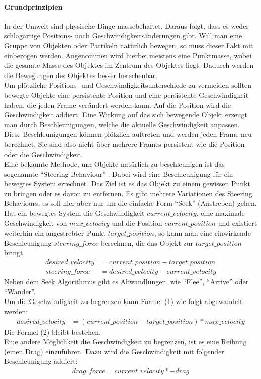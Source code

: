 \documentclass[11pt,a4paper]{article}
\begin{document}
\paragraph{Grundprinzipien}
In der Umwelt sind physische Dinge massebehaftet. Daraus folgt, dass es weder schlagartige Positions- noch Geschwindigkeitsänderungen gibt. Will man eine Gruppe von Objekten oder Partikeln natürlich bewegen, so muss dieser Fakt mit einbezogen werden. Angenommen wird hierbei meistens eine Punktmasse, wobei die gesamte Masse des Objektes im Zentrum des Objektes liegt. Dadurch werden die Bewegungen des Objektes besser berechenbar.\\
Um plötzliche Positions- und Geschwindigkeitsunterschiede zu vermeiden sollten bewegte Objekte eine persistente Position und eine persistente Geschwindigkeit haben, die jeden Frame verändert werden kann. Auf die Position wird die Geschwindigkeit addiert. Eine Wirkung auf das sich bewegende Objekt erzeugt man durch Beschleunigungen, welche die aktuelle Geschwindigkeit anpassen. Diese Beschleunigungen können plötzlich auftreten und werden jeden Frame neu berechnet. Sie sind also nicht über mehrere Frames persistent wie die Position oder die Geschwindigkeit.\\
Eine bekannte Methode, um Objekte natürlich zu beschleunigen ist das sogenannte ``Steering Behaviour'' \cite{580abc6c6615ef9f9c16f9069351938a0dda3c5120b7e8d1450d6b1abf0a71df}. Dabei wird eine Beschleunigung für ein bewegtes System errechnet. Das Ziel ist es das Objekt zu einem gewissen Punkt zu bringen oder es davon zu entfernen. Es gibt mehrere Variationen des Steering Behaviours, es soll hier aber nur um die einfache Form ``Seek'' (Anstreben) gehen.\\
Hat ein bewegtes System die Geschwindigkeit $current\_velocity$, eine maximale Geschwindigkeit von $max\_velocity$ und die Position $current\_position$ und existiert weiterhin ein angestrebter Punkt $target\_position$, so kann man eine einwirkende Beschleunigung $steering\_force$ berechnen, die das Objekt zur $target\_position$ bringt.
\begin{align}
desired\_velocity &= current\_position - target\_position \\
steering\_force &= desired\_velocity - current\_velocity
\end{align}
Neben dem Seek Algorithmus gibt es Abwandlungen, wie ``Flee'', ``Arrive'' oder ``Wander''.\\
Um die Geschwindigkeit zu begrenzen kann Formel (1) wie folgt abgewandelt werden:
\begin{align}
desired\_velocity &= (current\_position - target\_position) * max\_velocity
\end{align}
\noindent
Die Formel (2) bleibt bestehen.\\
Eine andere Möglichkeit die Geschwindigkeit zu begrenzen, ist es eine Reibung (einen Drag) einzuführen. Dazu wird die Geschwindigkeit mit folgender Beschleunigung addiert:
\begin{align}
drag\_force = current\_velocity * -drag
\end{align}
\end{document}
